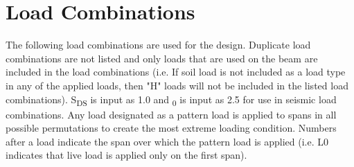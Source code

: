 \documentclass[12pt, fleqn]{article}
\begin{document}
\section{Load Combinations}
The following load combinations are used for the design. Duplicate load combinations are not listed and only loads that are used on the beam are included in the load combinations (i.e. If soil load is not included as a load type in any of the applied loads, then "H" loads will not be included in the listed load combinations). S\textsubscript{DS} is input as 1.0 and \textOmega\textsubscript{0} is input as 2.5 for use in seismic load combinations. Any load designated as a pattern load is applied to spans in all possible permutations to create the most extreme loading condition. Numbers after a load indicate the span over which the pattern load is applied (i.e. L0 indicates that live load is applied only on the first span).
\end{document}
